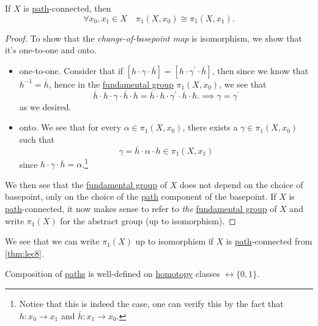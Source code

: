 \begin{theorem}\label{thm:lec8}
	If \(X\) is \hyperref[def:path]{path}-connected, then
	\[
		\forall x_0, x_1\in X\quad \pi_1(X, x_0)\cong \pi _1(X, x_1).
	\]
\end{theorem}
\begin{proof}
	\par To show that the \emph{change-of-basepoint map} is isomorphism, we show that it's one-to-one and onto.
	\begin{itemize}
		\item one-to-one. Consider that if \([h\cdot \gamma\cdot \overline{h} ] = [h\cdot \gamma ^\prime \cdot \overline{h} ]\), then since we know that \(h^{-1}  = \overline{h} \), hence
		      in the \hyperref[def:fundamental-group]{fundamental group} \(\pi _1(X, x_0)\), we see that
		      \[
			      \overline{h} \cdot h\cdot \gamma\cdot \overline{h} \cdot h = \overline{h} \cdot h\cdot \gamma ^\prime \cdot \overline{h} \cdot h. \implies \gamma = \gamma ^\prime
		      \]
		      as we desired.
		\item onto. We see that for every \(\alpha \in \pi_1(X, x_0)\), there exists a \(\gamma\in \pi_1(X, x_{0})\) such that
		      \[
			      \gamma = \overline{h} \cdot \alpha \cdot h\in \pi _1(X, x_1)
		      \]
		      since \(h\cdot \gamma\cdot \overline{h} =\alpha \).\footnote{Notice that this is indeed the case, one can verify this by the fact that \(h\colon x_{0}\to x_1\) and \(\overline{h} \colon x_1 \to x_0\).}
	\end{itemize}

	\par We then see that the \hyperref[def:fundamental-group]{fundamental group} of \(X\) does not depend on the choice of basepoint, only on the choice of the \hyperref[def:path]{path} component of the basepoint.
	If \(X\) is \hyperref[def:path]{path}-connected, it now makes sense to refer to \emph{the} \hyperref[def:fundamental-group]{fundamental group} of \(X\) and write \(\pi _1(X)\) for the abstract group (up to isomorphism).
\end{proof}
\begin{remark}
	We see that we can write \(\pi _1(X)\) up to isomorphism if \(X\) is \hyperref[def:path]{path}-connected from \autoref{thm:lec8}.
\end{remark}

\begin{exercise}
	Composition of \hyperref[def:path]{paths} is well-defined on \hyperref[def:homotopy]{homotopy} classes \hyperref[def:homotopy-relative]{\(\rel \{0, 1\}\)}.
\end{exercise}

